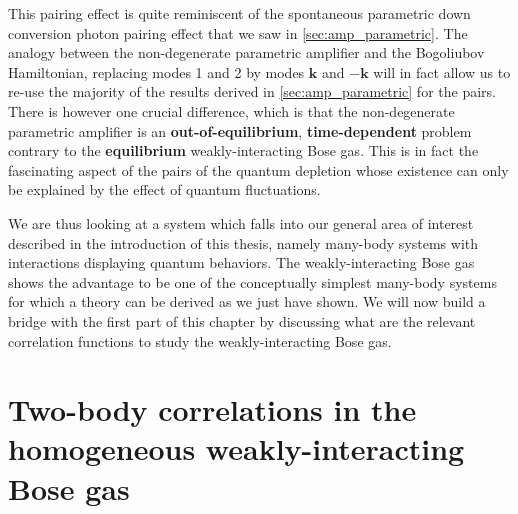 
This pairing effect is quite reminiscent of the spontaneous parametric down conversion photon pairing effect that we saw in \ref{sec:amp_parametric}. The analogy between the non-degenerate parametric amplifier and the Bogoliubov Hamiltonian, replacing modes 1 and 2 by modes $\bm{k}$ and $-\bm{k}$ will in fact allow us to re-use the majority of the results derived in \ref{sec:amp_parametric} for the \kmk pairs. There is however one crucial difference, which is that the non-degenerate parametric amplifier is an \textbf{out-of-equilibrium}, \textbf{time-dependent} problem contrary to the \textbf{equilibrium} weakly-interacting Bose gas. This is in fact the fascinating aspect of the \kmk pairs of the quantum depletion whose existence can only be explained by the effect of quantum fluctuations.



We are thus looking at a system which falls into our general area of interest described in the introduction of this thesis, namely many-body systems with interactions displaying quantum behaviors. The weakly-interacting Bose gas shows the advantage to be one of the conceptually simplest many-body systems for which a theory can be derived as we just have shown. We will now build a bridge with the first part of this chapter by discussing what are the relevant correlation functions to study the weakly-interacting Bose gas.


\section{Two-body correlations in the homogeneous weakly-interacting Bose gas}

